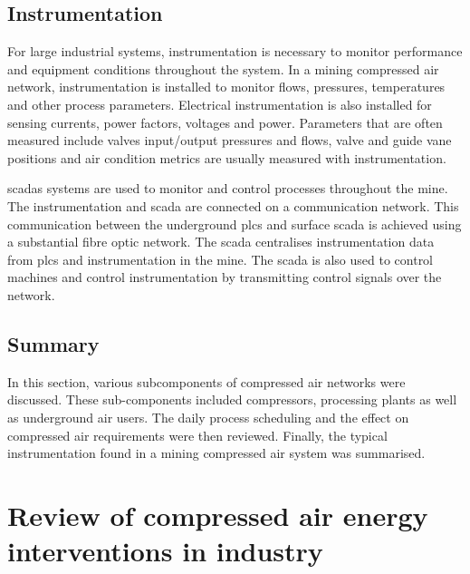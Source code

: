 \subsection{Instrumentation}
For large industrial systems, instrumentation is necessary to monitor performance and equipment conditions throughout the system. In a mining compressed air network, instrumentation is installed to monitor flows, pressures, temperatures and other process parameters. Electrical instrumentation is also installed for sensing currents, power factors, voltages and power. Parameters that are often measured include valves input/output pressures and flows, valve and guide vane positions and air condition metrics are usually measured with instrumentation.	
\par
\Glspl{scada} systems are used to monitor and control processes throughout the mine. The instrumentation and \gls{scada} are connected on a communication network.
This communication between the underground \glspl{plc} and surface \gls{scada} is achieved using a substantial fibre optic network\cite{schroeder2009energy}. The \gls{scada} centralises instrumentation data from \glspl{plc} and instrumentation in the mine. The \gls{scada} is also used to control machines and control instrumentation by transmitting control signals over the network. 
\subsection{Summary}
In this section, various subcomponents of compressed air networks were discussed. These sub-components included compressors, processing plants as well as underground air users. The daily process scheduling and the effect on compressed air requirements were then reviewed. Finally, the typical instrumentation found in a mining compressed air system was summarised.
\section{Review of compressed air energy interventions in industry}
